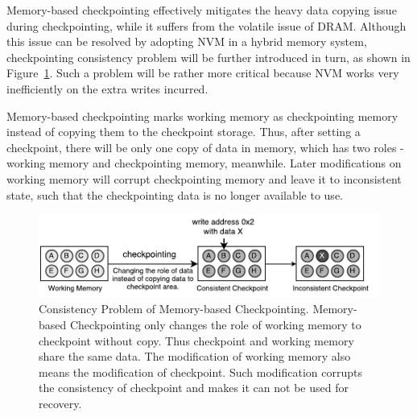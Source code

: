 \documentclass[conference]{IEEEtran}
\begin{document}

Memory-based checkpointing \cite{} effectively mitigates the heavy data copying issue during checkpointing, while it suffers from the volatile issue of DRAM. 
Although this issue can be resolved by adopting NVM in a hybrid memory system, checkpointing consistency problem will be further introduced in turn, as shown in Figure~\ref{fig:consistency}. Such a problem will be rather more critical because NVM works very inefficiently on the extra writes incurred.


Memory-based checkpointing marks working memory as checkpointing memory instead of copying them to the checkpoint storage.
Thus, after setting a checkpoint, there will be only one copy of data in memory, which has two roles - working memory and checkpointing memory, meanwhile.
Later modifications on working memory will corrupt checkpointing memory and leave it to inconsistent state, such that the checkpointing data is no longer available to use.


\begin{figure}
\includegraphics[width=\columnwidth]{consistency-2}
\caption{Consistency Problem of Memory-based Checkpointing.
Memory-based Checkpointing only changes the role of working memory to checkpoint without copy.
Thus checkpoint and working memory share the same data.
The modification of working memory also means the modification of checkpoint.
Such modification corrupts the consistency of checkpoint and makes it can not be used for recovery.
}
\label{fig:consistency}
\end{figure}
\end{document}
